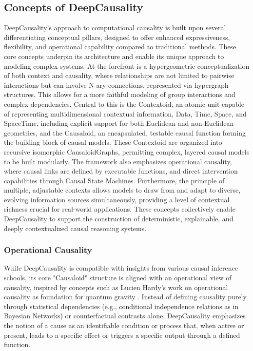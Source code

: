 \newpage

\subsection{Concepts of DeepCausality}
\label{sec:deep_causality_concepts}

DeepCausality's approach to computational causality is built upon several differentiating conceptual pillars, designed to offer enhanced expressiveness, flexibility, and operational capability compared to traditional methods. These core concepts underpin its architecture and enable its unique approach to modeling complex systems. At the forefront is a hypergeometric conceptualization of both context and causality, where relationships are not limited to pairwise interactions but can involve N-ary connections, represented via hypergraph structures. This allows for a more faithful modeling of group interactions and complex dependencies. Central to this is the Contextoid, an atomic unit capable of representing multidimensional contextual information, Data, Time, Space, and SpaceTime, including explicit support for both Euclidean and non-Euclidean geometries, and the Causaloid, an encapsulated, testable causal function forming the building block of causal models. These Contextoid are organized into recursive isomorphic CausaloidGraphs, permitting complex, layered causal models to be built modularly. The framework also emphasizes operational causality, where causal links are defined by executable functions, and direct intervention capabilities through Causal State Machines. Furthermore, the principle of multiple, adjustable contexts allows models to draw from and adapt to diverse, evolving information sources simultaneously, providing a level of contextual richness crucial for real-world applications. These concepts collectively enable DeepCausality to support the construction of deterministic, explainable, and deeply contextualized causal reasoning systems.

\subsubsection{Operational Causality}

While DeepCausality is compatible with insights from various causal inference schools, its core "Causaloid" structure is aligned with an operational view of causality, inspired by concepts such as Lucien Hardy's work on operational causality as foundation for quantum gravity \cite{hardy2005probability}. Instead of defining causality purely through statistical dependencies (e.g., conditional independence relations as in Bayesian Networks) or counterfactual contrasts alone, DeepCausality emphasizes the notion of a cause as an identifiable condition or process that, when active or present, leads to a specific effect or triggers a specific output through a defined function.


